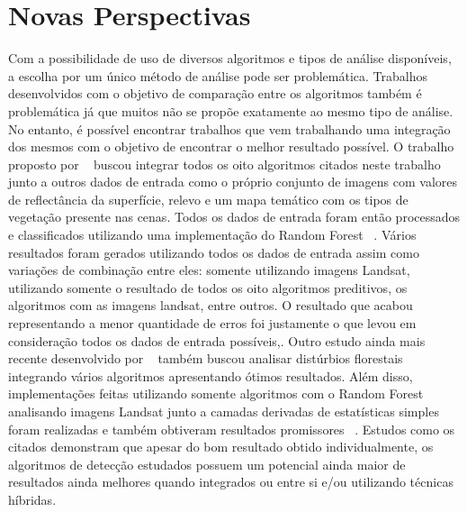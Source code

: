 \documentclass[twocolumn]{article}
\begin{document}
\section{Novas Perspectivas}
Com a possibilidade de uso de diversos algoritmos e tipos de análise disponíveis, a escolha por um único método de análise pode ser problemática. Trabalhos desenvolvidos com o objetivo de comparação entre os algoritmos também é problemática já que muitos não se propõe exatamente ao mesmo tipo de análise. No entanto, é possível encontrar trabalhos que vem trabalhando uma integração dos mesmos com o objetivo de encontrar o melhor resultado possível. O trabalho proposto por ~\cite{HEALEY2018717} buscou integrar todos os oito algoritmos citados neste trabalho junto a outros dados de entrada como o próprio conjunto de imagens com valores de reflectância da superfície, relevo e um mapa temático com os tipos de vegetação presente nas cenas. Todos os dados de entrada foram então processados e classificados utilizando uma implementação do Random Forest ~\cite{Breiman2001}. Vários resultados foram gerados utilizando todos os dados de entrada assim como variações de combinação entre eles: somente utilizando imagens Landsat, utilizando somente o resultado de todos os oito algoritmos preditivos, os algoritmos com as imagens landsat, entre outros. O resultado que acabou representando a menor quantidade de erros foi justamente o que levou em consideração todos os dados de entrada possíveis,. Outro estudo ainda mais recente desenvolvido por ~\cite{BULLOCK2019111165} também buscou analisar distúrbios florestais integrando vários algoritmos apresentando ótimos resultados. Além disso, implementações feitas utilizando somente algoritmos com o Random Forest analisando imagens Landsat junto a camadas derivadas de estatísticas simples foram realizadas e também obtiveram resultados promissores ~\cite{WANG2019474}.
Estudos como os citados demonstram que apesar do bom resultado obtido individualmente, os algoritmos de detecção estudados possuem um potencial ainda maior de resultados ainda melhores quando integrados ou entre si e/ou utilizando técnicas híbridas.



\end{document}
